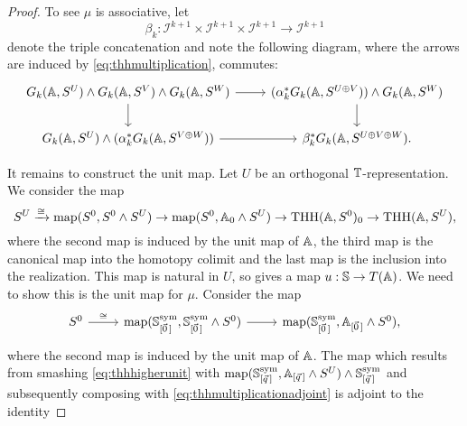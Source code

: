 \begin{proof}
To see $\mu$ is associative, let 
\[
\beta_k:\mathcal{I}^{k+1} \times \mathcal{I}^{k+1}\times
\mathcal{I}^{k+1}\to \mathcal{I}^{k+1}
\]
denote the triple concatenation and note the following diagram,
where the arrows are induced by \eqref{eq:thhmultiplication}, commutes:
\[
\begin{tikzcd}
G_k(\A,S^U)\wedge G_k(\A,S^V)\wedge G_k(\A,S^W)
\arrow{r}\arrow{d}
& (\alpha_k^\ast G_k(\A,S^{U\oplus V}))\wedge G_k(\A,S^W)
\arrow{d}\\
G_k(\A,S^U)\wedge(\alpha_k^\ast G_k(\A,S^{V\oplus W}))
\arrow{r}
&\beta_k^\ast G_k(\A,S^{U\oplus V\oplus W}).
\end{tikzcd}
\]

It remains to construct the unit map. Let $U$ be an orthogonal $\mathbb{T}$-representation.
We consider the map
\begin{equation}\label{eq:thhunit}
S^U\xrightarrow{\cong}
\mathrm{map}(S^0,S^0\wedge S^U)\to
\mathrm{map}(S^0,\mathbb{A}_0\wedge S^U)\to
\mathrm{THH}(\mathbb{A},S^0)_0\to
\mathrm{THH}(\mathbb{A},S^U),
\end{equation}
where the second map is induced by the unit map of $\mathbb{A}$, the third
map is the canonical map into the homotopy colimit and the last
map is the inclusion into the realization. This map is natural in $U$,
so gives a map $u:\mathbb{S}\to T(\mathbb{A})$. We need to show
this is the unit map for $\mu$. Consider the map
\begin{equation}\label{eq:thhhigherunit}
\begin{tikzcd}
 S^0
\arrow{r}{\cong}
&\map(\spherespectrum^{\mathrm{sym}}_{[\vec{0}\,]}, \spherespectrum^{\mathrm{sym}}_{[\vec{0}\,]} \wedge S^0)
\arrow{r}
&\map(\spherespectrum^{\mathrm{sym}}_{[\vec{0}\,]}, \A_{[\vec{0}\,]} \wedge S^0),
\end{tikzcd}
\end{equation}
where the second map is induced by the unit map of $\mathbb{A}$. The map which results
from smashing \eqref{eq:thhhigherunit} with $\mathrm{map}(\mathbb{S}^{\mathrm{sym}}_{[\vec{q}\,]}, \mathbb{A}_{[\vec{q}\,]}\wedge S^U)\wedge 
\mathbb{S}^{\mathrm{sym}}_{[\vec{q}\,]}$ and subsequently composing
with \eqref{eq:thhmultiplicationadjoint} is adjoint to the identity

\end{proof}
